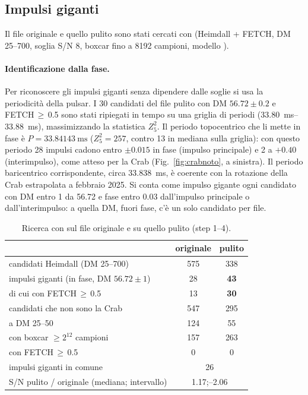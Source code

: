 \subsection{Impulsi giganti}
Il file originale e quello pulito sono stati cercati con  (Heimdall + FETCH, DM 25--700,
soglia S/N 8, boxcar fino a 8192 campioni, modello ).

\paragraph{Identificazione dalla fase.} Per riconoscere gli impulsi giganti senza dipendere dalle soglie si usa la
periodicità della pulsar. I 30 candidati del file pulito con DM $56.72\pm0.2$ e FETCH\,$\geq$\,0.5 sono stati ripiegati
in tempo su una griglia di periodi (\SIrange{33.80}{33.88}{\milli\second}), massimizzando la statistica $Z^2_5$. Il
periodo topocentrico che li mette in fase è $P=\SI{33.84143}{\milli\second}$ ($Z^2_5=257$, contro 13 in mediana sulla
griglia): con questo periodo 28 impulsi cadono entro $\pm0.015$ in fase (impulso principale) e 2 a $+0.40$
(interimpulso), come atteso per la Crab (Fig.~\ref{fig:crabnoto}, a sinistra). Il periodo baricentrico corrispondente,
circa \SI{33.838}{\milli\second}, è coerente con la rotazione della Crab estrapolata a febbraio 2025.
 Si conta come impulso gigante ogni candidato con DM entro 1 da 56.72 e fase
entro 0.03 dall'impulso principale o dall'interimpulso: a quella DM, fuori fase, c'è un solo candidato per file.

\begin{table}[ht]
\centering
\caption{Ricerca con  sul file originale e su quello pulito (step 1--4).}
\label{tab:crabnoto}
\small
\begin{tabular}{lcc}
\toprule
 & originale & pulito \\
\midrule
candidati Heimdall (DM 25--700) & 575 & 338 \\
impulsi giganti (in fase, DM $56.72\pm1$) & 28 & \textbf{43} \\
\quad di cui con FETCH\,$\geq$\,0.5 & 13 & \textbf{30} \\
candidati che non sono la Crab & 547 & 295 \\
\quad a DM 25--50 & 124 & 55 \\
\quad con boxcar $\geq2^{12}$ campioni & 157 & 263 \\
\quad con FETCH\,$\geq$\,0.5 & 0 & 0 \\
\midrule
impulsi giganti in comune & \multicolumn{2}{c}{26} \\
S/N pulito / originale (mediana; intervallo) & \multicolumn{2}{c}{1.17;\; 0.91--2.06} \\
\bottomrule
\end{tabular}
\end{table}

